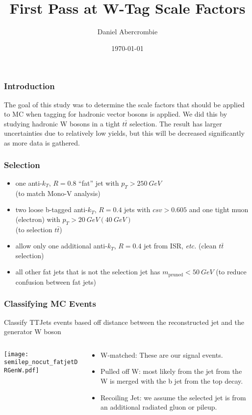 \documentclass{beamer}
\author[D. Abercrombie]{
  Daniel Abercrombie
}
\title{\bf \sffamily First Pass at W-Tag Scale Factors}
\date{\today}
\begin{document}
\begin{frame}[nonumbering]
  \titlepage
\end{frame}

\begin{frame}
  \frametitle{Introduction}
  The goal of this study was to determine the scale factors that should
  be applied to MC when tagging for hadronic vector bosons is applied.
  We did this by studying hadronic W bosons in a tight $t\bar{t}$ selection.
  The result has larger uncertainties due to relatively low yields,
  but this will be decreased significantly as more data is gathered.
\end{frame}

\begin{frame}
  \frametitle{Selection}
  \begin{itemize}
  \item one anti-$k_T$, $R = 0.8$ ``fat'' jet with $p_T > \SI{250}{GeV}$ \\
    (to match Mono-V analysis)
  \item two loose b-tagged anti-$k_T$, $R = 0.4$ jets with $csv > 0.605$ and 
    one tight muon (electron) with $p_T > \SI{20}{GeV} (\SI{40}{GeV})$ \\
    (to selection $t\bar{t}$)
  \item allow only one additional anti-$k_T$, $R = 0.4$ jet from ISR, \emph{etc.}
    (clean $t\bar{t}$ selection)
  \item all other fat jets that is not the selection jet has $m_\text{pruned} < \SI{50}{GeV}$
    (to reduce confusion between fat jets)
  \end{itemize}
\end{frame}

\begin{frame}
  \frametitle{Classifying MC Events}
  Classify TTJets events based off distance between the reconstructed jet and the
  generator W boson
  \begin{columns}
    \begin{column}{0.5\linewidth}
      \centering
      \vspace{20pt}
      \texttt{[image: semilep\_nocut\_fatjetDRGenW.pdf]}
    \end{column}
    \begin{column}{0.5\linewidth}
      \begin{itemize}
      \item W-matched: These are our signal events.
      \item Pulled off W: most likely from the jet from
        the W is merged with the b jet from the top decay.
      \item Recoiling Jet: we assume the selected
        jet is from an additional radiated gluon or pileup.
      \end{itemize}
    \end{column}
  \end{columns}
\end{frame}
\end{document}
